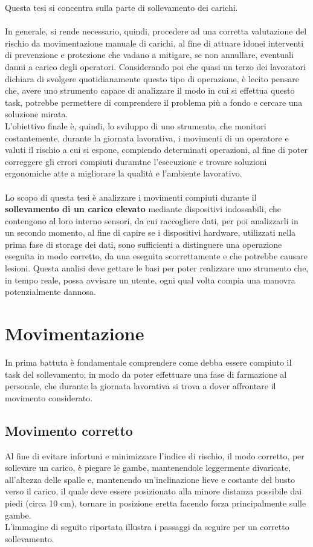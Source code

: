 \documentclass[a4paper]{article}
\begin{document}
Questa tesi si concentra sulla parte di sollevamento dei carichi. \\ \\
In generale, si rende necessario, quindi, procedere ad una corretta valutazione del rischio da movimentazione manuale di carichi, al fine di attuare idonei interventi di prevenzione e protezione che vadano a mitigare, se non annullare, eventuali danni a carico degli operatori. Considerando poi che quasi un terzo dei lavoratori dichiara di svolgere quotidianamente questo tipo di operazione, è lecito pensare che, avere uno strumento capace di analizzare il modo in cui si effettua questo task, potrebbe permettere di comprendere il problema più a fondo e cercare una soluzione mirata.\\
L'obiettivo finale è, quindi, lo sviluppo di uno strumento, che monitori costantemente, durante la giornata lavorativa, i movimenti di un operatore e valuti il rischio a cui si espone, compiendo determinati operazioni, al fine di poter correggere gli errori compiuti duramtne l'esecuzione e trovare soluzioni ergonomiche atte a migliorare la qualità e l'ambiente lavorativo.\\ \\
Lo scopo di questa tesi è analizzare i movimenti compiuti durante il \textbf{sollevamento di un carico elevato} mediante dispositivi indossabili, che contengono al loro interno sensori, da cui raccogliere dati, per poi analizzarli in un secondo momento, al fine di capire se i dispositivi hardware, utilizzati nella prima fase di storage dei dati, sono sufficienti a distinguere una operazione eseguita in modo corretto, da una eseguita scorrettamente e che potrebbe causare lesioni. Questa analisi deve gettare le basi per poter realizzare uno strumento che, in tempo reale, possa avvisare un utente, ogni qual volta compia una manovra potenzialmente dannosa.


	\clearpage

	\section{Movimentazione}

In prima battuta è fondamentale comprendere come debba essere compiuto il task del sollevamento; in modo da poter effettuare una fase di farmazione al personale, che durante la giornata lavorativa si trova a dover affrontare il movimento considerato. 
	\subsection{Movimento corretto}
Al fine di evitare infortuni e minimizzare l'indice di rischio, il modo corretto, per sollevare un carico, è piegare le gambe, mantenendole leggermente divaricate, all'altezza delle spalle e, mantenendo un’inclinazione lieve e costante del busto verso il carico, il quale deve essere posizionato alla minore distanza possibile dai piedi (circa 10 cm), tornare in posizione eretta facendo forza principalmente sulle gambe. \\ L'immagine di seguito riportata illustra i passaggi da seguire per un corretto sollevamento.\\
\end{document}

